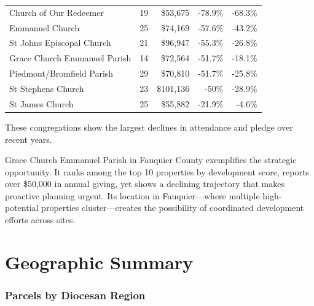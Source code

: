 \documentclass[
  letterpaper,
  DIV=11,
  numbers=noendperiod,
  oneside]{scrreprt}
\begin{document}
\begin{longtable*}[t]{lrrrr}
\toprule
{} &  &  &  & \\
\midrule
Church of Our Redeemer & 19 & \$53,675 & -78.9\% & -68.3\%\\
Emmanuel Church & 25 & \$74,169 & -57.6\% & -43.2\%\\
St Johns Episcopal Church & 21 & \$96,947 & -55.3\% & -26.8\%\\
Grace Church Emmanuel Parish & 14 & \$72,564 & -51.7\% & -18.1\%\\
Piedmont/Bromfield Parish & 29 & \$70,810 & -51.7\% & -25.8\%\\
\addlinespace
St Stephens Church & 23 & \$101,136 & -50\% & -28.9\%\\
St James Church & 25 & \$55,882 & -21.9\% & -4.6\%\\
\bottomrule
\end{longtable*}

These congregations show the largest declines in attendance and pledge
over recent years.

Grace Church Emmanuel Parish in Fauquier County exemplifies the
strategic opportunity. It ranks among the top 10 properties by
development score, reports over \$50,000 in annual giving, yet shows a
declining trajectory that makes proactive planning urgent. Its location
in Fauquier---where multiple high-potential properties cluster---creates
the possibility of coordinated development efforts across sites.

\chapter{Geographic Summary}\label{geographic-summary}

\subsection{Parcels by Diocesan
Region}\label{parcels-by-diocesan-region}
\end{document}
